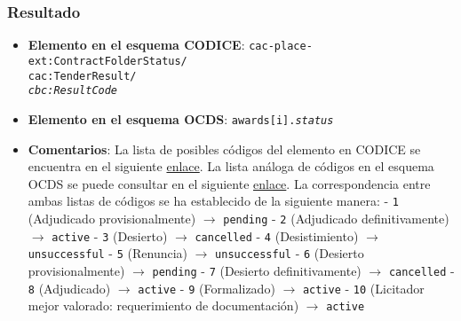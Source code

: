         \subsubsection{Resultado}
            \begin{itemize}
                \item \textbf{Elemento en el esquema CODICE}:
                    \tabto{7.6cm} \texttt{cac-place-ext:ContractFolderStatus/} \\
                    \tabto{7.6cm} \texttt{cac:TenderResult/} \\
                    \tabto{7.6cm} \texttt{\textit{cbc:ResultCode}}
                \item \textbf{Elemento en el esquema OCDS}:
                    \tabto{7.6cm} \texttt{awards[i].\textit{status}}
                \item \textbf{Comentarios}: La lista de posibles códigos del elemento en CODICE se encuentra en el siguiente 
                    \href{http://contrataciondelestado.es/codice/cl/2.02/TenderResultCode-2.02.gc}{enlace}.
                    La lista análoga de códigos en el esquema OCDS se puede consultar en el siguiente
                    \href{https://standard.open-contracting.org/latest/en/schema/codelists/#award-status}{enlace}.
                    La correspondencia entre ambas listas de códigos se ha establecido de la siguiente manera:
                        \subitem - \texttt{1} (Adjudicado provisionalmente) $\rightarrow$ \texttt{pending}
                        \subitem - \texttt{2} (Adjudicado definitivamente) $\rightarrow$ \texttt{active}
                        \subitem - \texttt{3} (Desierto) $\rightarrow$ \texttt{cancelled}
                        \subitem - \texttt{4} (Desistimiento) $\rightarrow$ \texttt{unsuccessful}
                        \subitem - \texttt{5} (Renuncia) $\rightarrow$ \texttt{unsuccessful}
                        \subitem - \texttt{6} (Desierto provisionalmente) $\rightarrow$ \texttt{pending}
                        \subitem - \texttt{7} (Desierto definitivamente) $\rightarrow$ \texttt{cancelled}
                        \subitem - \texttt{8} (Adjudicado) $\rightarrow$ \texttt{active}
                        \subitem - \texttt{9} (Formalizado) $\rightarrow$ \texttt{active}
                        \subitem - \texttt{10} (Licitador mejor valorado: requerimiento de documentación) $\rightarrow$ \texttt{active}
            \end{itemize}
            
